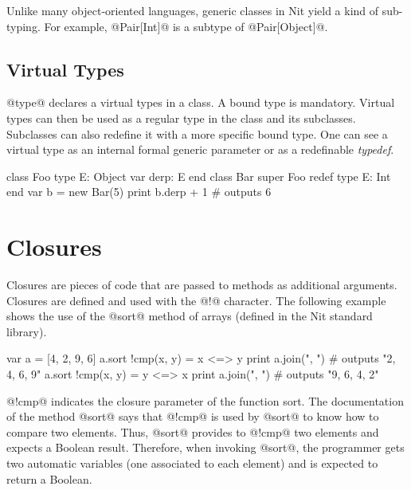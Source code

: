 Unlike many object-oriented languages, generic classes in Nit yield a kind of sub-typing.
For example, @Pair[Int]@ is a subtype of @Pair[Object]@.

\subsection{Virtual Types}\label{type}

@type@ declares a virtual types in a class.
A bound type is mandatory.
Virtual types can then be used as a regular type in the class and its subclasses.
Subclasses can also redefine it with a more specific bound type.
One can see a virtual type as an internal formal generic parameter or as a redefinable \textit{typedef}.

\begin{lst}
class Foo
	type E: Object
	var derp: E 
end
class Bar
	super Foo
	redef type E: Int
end
var b = new Bar(5)
print b.derp + 1 # outputs 6
\end{lst}

\section{Closures}\label{closure}

Closures are pieces of code that are passed to methods as additional arguments.
Closures are defined and used with the @!@ character.
The following example shows the use of the @sort@ method of arrays (defined in the Nit standard library).

\begin{lst}
var a = [4, 2, 9, 6]
a.sort !cmp(x, y) = x <=> y
print a.join(", ") # outputs "2, 4, 6, 9"
a.sort !cmp(x, y) = y <=> x
print a.join(", ") # outputs "9, 6, 4, 2"
\end{lst}

@!cmp@ indicates the closure parameter of the function sort.
The documentation of the method @sort@ says that @!cmp@ is used by @sort@ to know how to compare two elements.
Thus, @sort@ provides to @!cmp@ two elements and expects a Boolean result. %
Therefore, when invoking @sort@, the programmer gets two automatic variables (one associated to each element) and is expected to return a Boolean.

